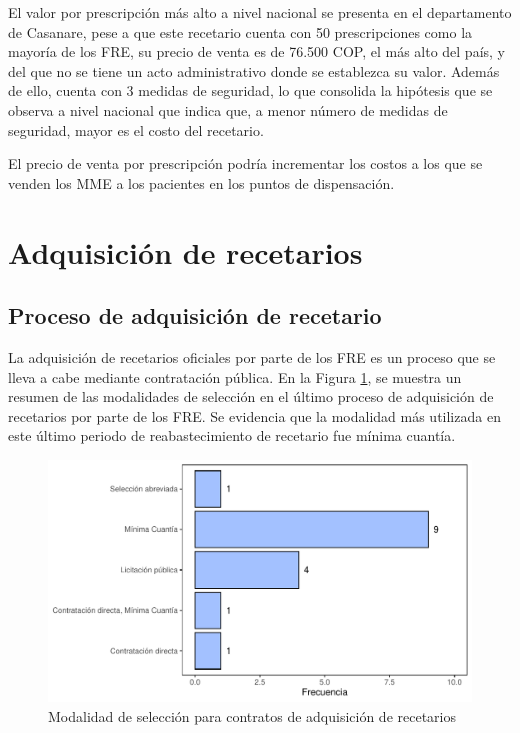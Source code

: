 \documentclass[
]{book}
\begin{document}
El valor por prescripción más alto a nivel nacional se presenta en el departamento de Casanare, pese a que este recetario cuenta con 50 prescripciones como la mayoría de los FRE, su precio de venta es de 76.500 COP, el más alto del país, y del que no se tiene un acto administrativo donde se establezca su valor. Además de ello, cuenta con 3 medidas de seguridad, lo que consolida la hipótesis que se observa a nivel nacional que indica que, a menor número de medidas de seguridad, mayor es el costo del recetario.

El precio de venta por prescripción podría incrementar los costos a los que se venden los MME a los pacientes en los puntos de dispensación.

\hypertarget{adquisiciuxf3n-de-recetarios}{%
\section{Adquisición de recetarios}\label{adquisiciuxf3n-de-recetarios}}


\hypertarget{proceso-de-adquisiciuxf3n-de-recetario}{%
\subsection{Proceso de adquisición de recetario}\label{proceso-de-adquisiciuxf3n-de-recetario}}

La adquisición de recetarios oficiales por parte de los FRE es un proceso que se lleva a cabe mediante contratación pública. En la Figura \ref{fig:modalidadAdquisicion}, se muestra un resumen de las modalidades de selección en el último proceso de adquisición de recetarios por parte de los FRE. Se evidencia que la modalidad más utilizada en este último periodo de reabastecimiento de recetario fue mínima cuantía.

\begin{figure}

{\centering \includegraphics[width=0.85\linewidth]{InformeFinal_files/figure-latex/modalidadAdquisicion-1} 

}

\caption{Modalidad de selección para contratos de adquisición de recetarios}\label{fig:modalidadAdquisicion}
\end{figure}
\end{document}
